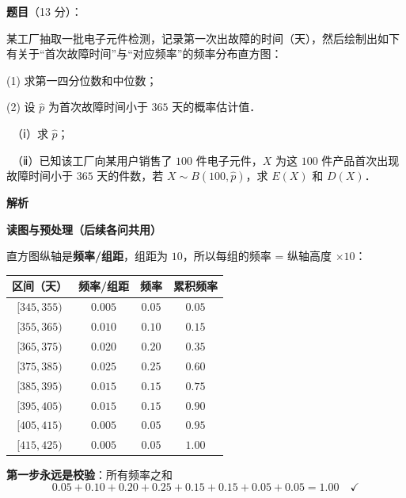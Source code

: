 
\begin{answer}

\textbf{题目}（13 分）：

某工厂抽取一批电子元件检测，记录第一次出故障的时间（天），然后绘制出如下有关于“首次故障时间”与“对应频率”的频率分布直方图：
\nopagebreak[4]
\begin{center}\end{center}
\nopagebreak[4]
  (1) 求第一四分位数和中位数；

  (2) 设 $\hat{p}$ 为首次故障时间小于 $365$ 天的概率估计值．

  　（ⅰ）求 $\hat{p}$；

  　（ⅱ）已知该工厂向某用户销售了 $100$ 件电子元件，$X$ 为这 $100$ 件产品首次出现故障时间小于 $365$ 天的件数，若 $X\sim B(100,\hat{p})$，求 $E(X)$ 和 $D(X)$．

\textbf{解析}

\par\medskip

\textbf{读图与预处理（后续各问共用）}

直方图纵轴是\textbf{频率/组距}，组距为 $10$，所以每组的频率 = 纵轴高度 $\times10$：

\begin{center}
\begin{tabular}{cccc}
\toprule
区间（天） & 频率/组距 & 频率 & 累积频率 \\
\midrule
$[345,355)$ & $0.005$ & $0.05$ & $0.05$ \\
$[355,365)$ & $0.010$ & $0.10$ & $0.15$ \\
$[365,375)$ & $0.020$ & $0.20$ & $0.35$ \\
$[375,385)$ & $0.025$ & $0.25$ & $0.60$ \\
$[385,395)$ & $0.015$ & $0.15$ & $0.75$ \\
$[395,405)$ & $0.015$ & $0.15$ & $0.90$ \\
$[405,415)$ & $0.005$ & $0.05$ & $0.95$ \\
$[415,425)$ & $0.005$ & $0.05$ & $1.00$ \\
\bottomrule
\end{tabular}
\end{center}

\textbf{第一步永远是校验}：所有频率之和
\nopagebreak[4]
\[0.05+0.10+0.20+0.25+0.15+0.15+0.05+0.05=1.00\quad\checkmark\]


\end{answer}
